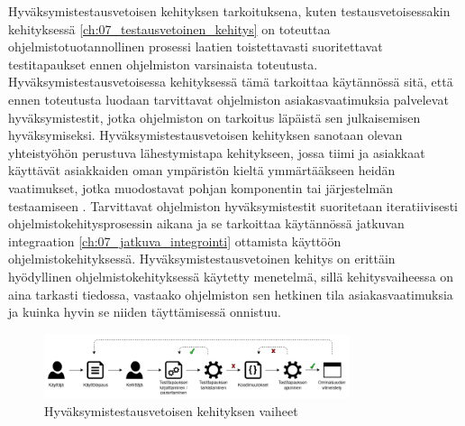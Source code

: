   Hyväksymistestausvetoisen kehityksen tarkoituksena, kuten testausvetoisessakin kehityksessä \ref{ch:07_testausvetoinen_kehitys} on toteuttaa ohjelmistotuotannollinen prosessi laatien toistettavasti suoritettavat testitapaukset ennen ohjelmiston varsinaista toteutusta.
  Hyväksymistestausvetoisessa kehityksessä tämä tarkoittaa käytännössä sitä, että ennen toteutusta luodaan tarvittavat ohjelmiston asiakasvaatimuksia palvelevat hyväksymistestit, jotka ohjelmiston on tarkoitus läpäistä sen julkaisemisen hyväksymiseksi.
  Hyväksymistestausvetoisen kehityksen sanotaan olevan yhteistyöhön perustuva lähestymistapa kehitykseen, jossa tiimi ja asiakkaat käyttävät asiakkaiden oman ympäristön kieltä ymmärtääkseen heidän vaatimukset, jotka muodostavat pohjan komponentin tai järjestelmän testaamiseen \parencite{istqb_glossary_nodate}.
  Tarvittavat ohjelmiston hyväksymistestit suoritetaan iteratiivisesti ohjelmistokehitysprosessin aikana ja se tarkoittaa käytännössä jatkuvan integraation \ref{ch:07_jatkuva_integrointi} ottamista käyttöön ohjelmistokehityksessä.
  Hyväksymistestausvetoinen kehitys on erittäin hyödyllinen ohjelmistokehityksessä käytetty menetelmä, sillä kehitysvaiheessa on aina tarkasti tiedossa, vastaako ohjelmiston sen hetkinen tila asiakasvaatimuksia ja kuinka hyvin se niiden täyttämisessä onnistuu.

  \begin{figure}[H]
    \centering
    \includegraphics[width=0.8\textwidth]{assets/hyvaksymistestausvetoinen-kehitys.png}
    \caption{Hyväksymistestausvetoisen kehityksen vaiheet}
    \label{fig:hyvaksymistestausvetoinen-kehitys}
  \end{figure}

